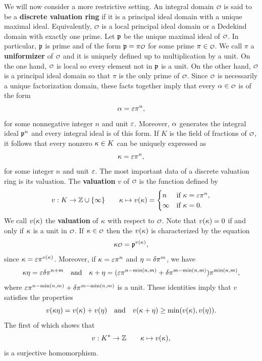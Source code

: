     We will now consider a more restrictive setting. An integral domain \(\smc{O}\) is said to be a \textbf{discrete valuation ring} if it is a principal ideal domain with a unique maximal ideal. Equivalently, \(\smc{O}\) is a local principal ideal domain or a Dedekind domain with exactly one prime. Let \(\mathfrak{p}\) be the unique maximal ideal of \(\smc{O}\). In particular, \(\mathfrak{p}\) is prime and of the form \(\mf{p} = \pi\smc{O}\) for some prime \(\pi \in \smc{O}\). We call \(\pi\) a \textbf{uniformizer} of \(\smc{O}\) and it is uniquely defined up to multiplication by a unit. On the one hand, \(\smc{O}\) is local so every element not in \(\mathfrak{p}\) is a unit. On the other hand, \(\smc{O}\) is a principal ideal domain so that \(\pi\) is the only prime of \(\smc{O}\). Since \(\smc{O}\) is necessarily a unique factorization domain, these facts together imply that every \(\a \in \smc{O}\) is of the form
    \[
      \alpha = \varepsilon\pi^{n},
    \]
    for some nonnegative integer \(n\) and unit \(\varepsilon\). Moreover, \(\alpha\) generates the integral ideal \(\mathfrak{p}^{n}\) and every integral ideal is of this form. If \(K\) is the field of fractions of \(\smc{O}\), it follows that every nonzero \(\kappa \in K\) can be uniquely expressed as
    \[
      \kappa = \varepsilon\pi^{n},
    \]
    for some integer \(n\) and unit \(\varepsilon\). The most important data of a discrete valuation ring is its valuation. The \textbf{valuation} \(v\) of \(\smc{O}\) is the function defined by
    \[
      v:K \to \mathbb{Z} \cup \{\infty\} \qquad \kappa \mapsto v(\kappa) = \begin{cases} n & \text{if \(\kappa= \varepsilon\pi^{n}\)}, \\ \infty & \text{if \(\kappa= 0\)}. \end{cases}
    \]
    We call \(v(\kappa)\) the \textbf{valuation} of \(\kappa\) with respect to \(\smc{O}\). Note that \(v(\kappa) = 0\) if and only if \(\kappa\) is a unit in \(\smc{O}\). If \(\k \in \smc{O}\) then the \(v(\kappa)\) is characterized by the equation
    \[
      \k\smc{O} = \mf{p}^{v(\k)},
    \]
    since \(\kappa = \varepsilon\pi^{v(\kappa)}\). Moreover, if \(\kappa = \varepsilon\pi^{n}\) and \(\eta = \delta\pi^{m}\), we have
    \[
      \kappa\eta = \varepsilon\delta\pi^{n+m} \quad \text{and} \quad \kappa+\eta = (\varepsilon\pi^{n-\min(n,m)}+\delta\pi^{m-\min(n,m)})\pi^{\min(n,m)},
    \]
    where \(\varepsilon\pi^{n-\min(n,m)}+\delta\pi^{m-\min(n,m)}\) is a unit. These identities imply that \(v\) satisfies the properties
    \[
      v(\kappa\eta) = v(\kappa)+v(\eta) \quad \text{and} \quad v(\kappa+\eta) \ge \min(v(\kappa),v(\eta)).
    \]
    The first of which shows that
    \[
      v:K^{\ast} \to \mathbb{Z} \qquad \kappa \mapsto v(\kappa),
    \]
    is a surjective homomorphism.


